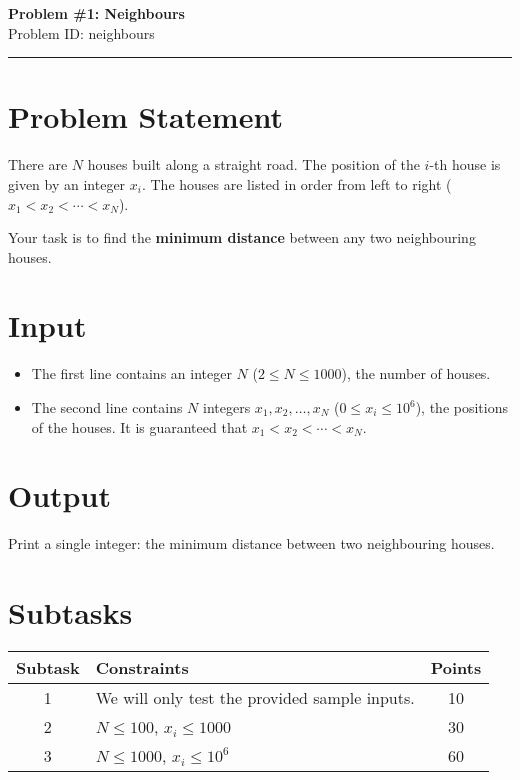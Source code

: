 \documentclass[12pt,a4paper]{article}
\begin{document}
\ifdefined\BOOKLET
  \pagestyle{empty}
\fi

\begin{center}
    {\LARGE \textbf{Problem \#1: Neighbours}} \\[0.5em]
    {Problem ID: neighbours} \\[1em]
    \rule{\textwidth}{0.4pt}
\end{center}

\vspace{1em}

\section*{Problem Statement}
There are $N$ houses built along a straight road.  
The position of the $i$-th house is given by an integer $x_i$.  
The houses are listed in order from left to right ($x_1 < x_2 < \cdots < x_N$).  

Your task is to find the \textbf{minimum distance} between any two neighbouring houses.

\section*{Input}
\begin{itemize}
    \item The first line contains an integer $N$ ($2 \leq N \leq 1000$), the number of houses.  
    \item The second line contains $N$ integers $x_1, x_2, \ldots, x_N$ ($0 \leq x_i \leq 10^6$),  
    the positions of the houses. It is guaranteed that $x_1 < x_2 < \cdots < x_N$.  
\end{itemize}

\section*{Output}
Print a single integer: the minimum distance between two neighbouring houses.

\section*{Subtasks}
\begin{center}
\begin{tabularx}{\textwidth}{|c|X|c|}
\hline
\textbf{Subtask} & \textbf{Constraints} & \textbf{Points} \\
\hline
1 & We will only test the provided sample inputs. & 10 \\
\hline
2 & $N \leq 100$, $x_i \leq 1000$ & 30 \\
\hline
3 & $N \leq 1000$, $x_i \leq 10^6$ & 60 \\
\hline
\end{tabularx}
\end{center}
\end{document}

